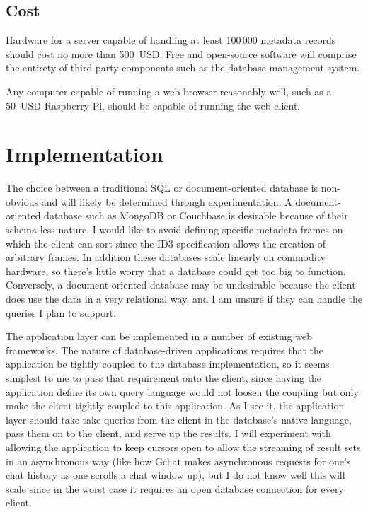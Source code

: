 \documentclass{abrice}
\begin{document}
\subsection{Cost}

Hardware for a server capable of handling at least 100\,000 metadata records
should cost no more than 500~USD\@. Free and open-source software will comprise
the entirety of third-party components such as the database management system.

Any computer capable of running a web browser reasonably well, such as a 50~USD
Raspberry Pi, should be capable of running the web client.

\section{Implementation}

The choice between a traditional SQL or document-oriented database is
non-obvious and will likely be determined through experimentation. A
document-oriented database such as MongoDB or Couchbase is desirable because of
their schema-less nature. I would like to avoid defining specific metadata
frames on which the client can sort since the ID3 specification allows the
creation of arbitrary frames. In addition these databases scale linearly on
commodity hardware, so there's little worry that a database could get too big to
function. Conversely, a document-oriented database may be undesirable because
the client does use the data in a very relational way, and I am unsure if they
can handle the queries I plan to support.

The application layer can be implemented in a number of existing web
frameworks. The nature of database-driven applications requires that the
application be tightly coupled to the database implementation, so it seems
simplest to me to pass that requirement onto the client, since having the
application define its own query language would not loosen the coupling but only
make the client tightly coupled to this application. As I see it, the
application layer should take take queries from the client in the database's
native language, pass them on to the client, and serve up the results. I will
experiment with allowing the application to keep cursors open to allow the
streaming of result sets in an asynchronous way (like how Gchat makes
asynchronous requests for one's chat history as one scrolls a chat window up),
but I do not know well this will scale since in the worst case it requires an
open database connection for every client.
\end{document}
